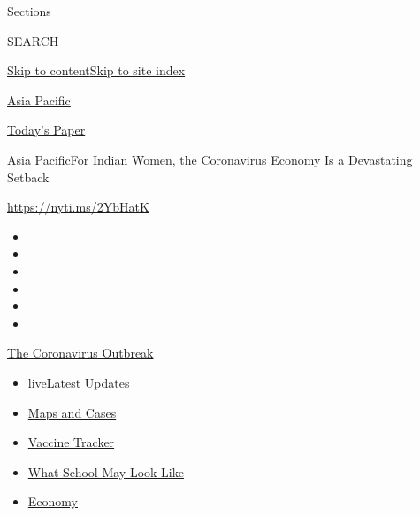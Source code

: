 Sections

SEARCH

\protect\hyperlink{site-content}{Skip to
content}\protect\hyperlink{site-index}{Skip to site index}

\href{https://www.nytimes.com/section/world/asia}{Asia Pacific}

\href{https://myaccount.nytimes.com/auth/login?response_type=cookie\&client_id=vi}{}

\href{https://www.nytimes.com/section/todayspaper}{Today's Paper}

\href{/section/world/asia}{Asia Pacific}\textbar{}For Indian Women, the
Coronavirus Economy Is a Devastating Setback

\url{https://nyti.ms/2YbHatK}

\begin{itemize}
\item
\item
\item
\item
\item
\item
\end{itemize}

\href{https://www.nytimes.com/news-event/coronavirus?action=click\&pgtype=Article\&state=default\&region=TOP_BANNER\&context=storylines_menu}{The
Coronavirus Outbreak}

\begin{itemize}
\tightlist
\item
  live\href{https://www.nytimes.com/2020/08/02/world/coronavirus-updates.html?action=click\&pgtype=Article\&state=default\&region=TOP_BANNER\&context=storylines_menu}{Latest
  Updates}
\item
  \href{https://www.nytimes.com/interactive/2020/us/coronavirus-us-cases.html?action=click\&pgtype=Article\&state=default\&region=TOP_BANNER\&context=storylines_menu}{Maps
  and Cases}
\item
  \href{https://www.nytimes.com/interactive/2020/science/coronavirus-vaccine-tracker.html?action=click\&pgtype=Article\&state=default\&region=TOP_BANNER\&context=storylines_menu}{Vaccine
  Tracker}
\item
  \href{https://www.nytimes.com/interactive/2020/07/29/us/schools-reopening-coronavirus.html?action=click\&pgtype=Article\&state=default\&region=TOP_BANNER\&context=storylines_menu}{What
  School May Look Like}
\item
  \href{https://www.nytimes.com/live/2020/07/31/business/stock-market-today-coronavirus?action=click\&pgtype=Article\&state=default\&region=TOP_BANNER\&context=storylines_menu}{Economy}
\end{itemize}

